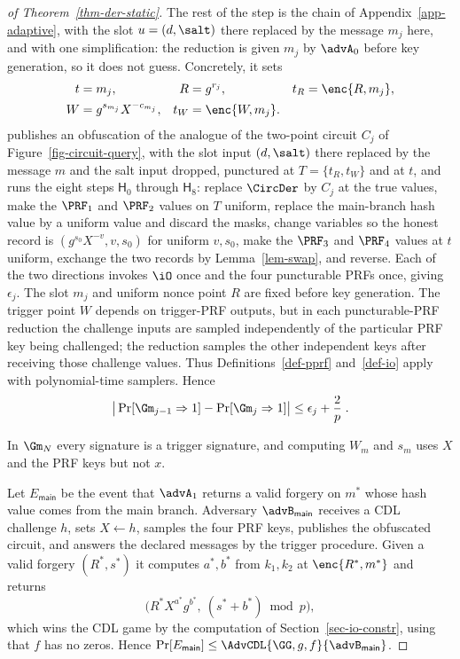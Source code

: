 \begin{proof}[of Theorem~\ref{thm-der-static}]
The rest of the step is the chain of Appendix~\ref{app-adaptive}, with the slot $u=(d,\salt)$ there replaced by the message $m_j$ here, and with one simplification: the reduction is given $m_j$ by $\advA_0$ before key generation, so it does not guess. Concretely, it sets
$$
\begin{aligned}
t&=m_j,&
R&=g^{r_j},&
t_R&=\enc{R,m_j},\\
W&=g^{s_{m_j}}X^{-c_{m_j}},&
t_W&=\enc{W,m_j}.
\end{aligned}
$$
publishes an obfuscation of the analogue of the two-point circuit $C_j$ of Figure~\ref{fig-circuit-query}, with the slot input $(d,\salt)$ there replaced by the message $m$ and the salt input dropped, punctured at $T=\{t_R,t_W\}$ and at $t$, and runs the eight steps $\mathsf{H}_0$ through $\mathsf{H}_8$: replace $\CircDer$ by $C_j$ at the true values, make the $\PRF_1$ and $\PRF_2$ values on $T$ uniform, replace the main-branch hash value by a uniform value and discard the masks, change variables so the honest record is $(g^{s_0}X^{-v},v,s_0)$ for uniform $v,s_0$, make the $\PRF_3$ and $\PRF_4$ values at $t$ uniform, exchange the two records by Lemma~\ref{lem-swap}, and reverse. Each of the two directions invokes $\iO$ once and the four puncturable PRFs once, giving $\epsilon_j$. The slot $m_j$ and uniform nonce point $R$ are fixed before key generation. The trigger point $W$ depends on trigger-PRF outputs, but in each puncturable-PRF reduction the challenge inputs are sampled independently of the particular PRF key being challenged; the reduction samples the other independent keys after receiving those challenge values. Thus Definitions~\ref{def-pprf} and~\ref{def-io} apply with polynomial-time samplers. Hence
$$
\big|\Pr[\Gm_{j-1}\Rightarrow1]-\Pr[\Gm_j\Rightarrow1]\big|
\le \epsilon_j+\frac{2}{p} \;.
$$

In $\Gm_N$ every signature is a trigger signature, and computing $W_{m}$ and $s_{m}$ uses $X$ and the PRF keys but not $x$.

 Let $E_{\mathsf{main}}$ be the event that $\advA_1$ returns a valid forgery on $m^*$ whose hash value comes from the main branch. Adversary $\advB_{\mathsf{main}}$ receives a CDL challenge $h$, sets $X\gets h$, samples the four PRF keys, publishes the obfuscated circuit, and answers the declared messages by the trigger procedure. Given a valid forgery $(R^*,s^*)$ it computes $a^*,b^*$ from $k_1,k_2$ at $\enc{R^*,m^*}$ and returns
$$
\big(R^*X^{a^*}g^{b^*},\ (s^*+b^*)\bmod p\big),
$$
which wins the CDL game by the computation of Section~\ref{sec-io-constr}, using that $f$ has no zeros. Hence $\Pr[E_{\mathsf{main}}]\le\AdvCDL{\GG,g,f}{\advB_{\mathsf{main}}}$.


\end{proof}
